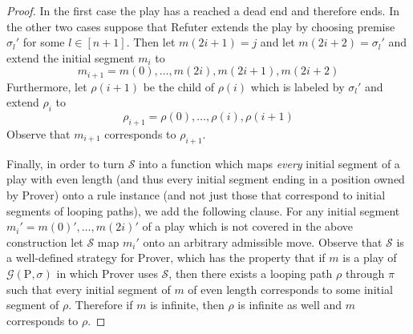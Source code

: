 \documentclass{myifcolog}
\newcommand{\hickp}{\mathrm{P}}
\numberwithin{theorem}{section}
\begin{document}
\begin{proof}
	 In the first case the play has a reached a dead end and therefore ends. In the other two cases suppose that Refuter extends the play by choosing premise $\sigma_l'$ for some $l \in [n+1]$. Then let $m(2i+1) = j$ and let $m(2i+2) = \sigma_l'$ and extend the initial segment $m_i$ to
	 \begin{equation*}
	     m_{i+1} =  m(0),  \ldots, m(2i), m(2i+1), m(2i+2)
	 \end{equation*}
	 Furthermore, let $\rho(i+1)$ be the child of $\rho(i)$ which is labeled by $\sigma_l'$ and extend $\rho_i$ to
	 \begin{equation*}
	     \rho_{i+1} = \rho(0), \ldots, \rho(i), \rho(i+1)
	 \end{equation*}
	 Observe that $m_{i+1}$ corresponds to $\rho_{i+1}$.\smallskip
	 
	 Finally, in order to turn $\mathcal{S}$ into a function which maps \emph{every} initial segment of a play with even length (and thus every initial segment ending in a position owned by Prover) onto a rule instance (and not just those that correspond to initial segments of looping paths), we add the following clause. For any initial segment $m_i' = m(0)', \ldots, m(2i)' $ of a play which is not covered in the above construction let $\mathcal{S}$ map $m_i'$ onto an arbitrary admissible move. Observe that $\mathcal{S}$ is a well-defined strategy for Prover, which has the property that if $m$ is a play of $\mathscr{G}(\hickp,\sigma)$ in which Prover uses $\mathcal{S}$, then there exists a looping path $\rho$ through $\pi$ such that every initial segment of $m$ of even length corresponds to some initial segment of $\rho$. Therefore if $m$ is infinite, then $\rho$ is infinite as well and $m$ corresponds to $\rho$.\smallskip
	 

\end{proof}
\end{document}

